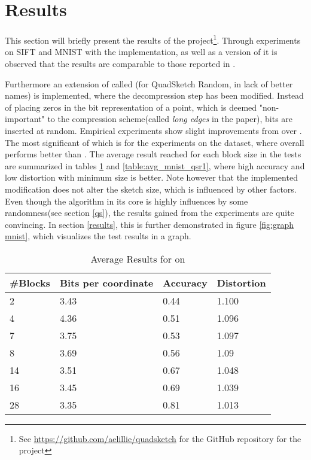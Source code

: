 \section{Results}
\label{contribution}
This section will briefly present the results of the project\footnote{See \url{https://github.com/aelillie/quadsketch} for the GitHub repository for the project}. Through experiments on SIFT and MNIST with the \qs{} implementation, as well as a version of \gr{} it is observed that the results are comparable to those reported in \cite{wagner17}. 

Furthermore an extension of \qs{} called \qsr{} (for QuadSketch Random, in lack of better names) is implemented, where the decompression step has been modified. Instead of placing zeros in the bit representation of a point, which is deemed "non-important" to the compression scheme(called \textit{long edges} in the paper), bits are inserted at random. Empirical experiments show slight improvements from \qsr{} over \qs{}. The most significant of which is for the experiments on the \mnist{} dataset, where \qsr{} overall performs better than \qs{}. The average result reached for each block size in the tests are summarized in tables \ref{table:avg_mnist_qs1} and \ref{table:avg_mnist_qsr1}, where high accuracy and low distortion with minimum size is better. Note however that the implemented modification does not alter the sketch size, which is influenced by other factors. Even though the algorithm in its core is highly influences by some randomness(see section \ref{qs}), the results gained from the experiments are quite convincing. In section \ref{results}, this is further demonstrated in figure \ref{fig:graph mnist}, which visualizes the test results in a graph.


\begin{table}[h]
	\centering
	\caption{Average Results for \qs{} on \mnist{}}
	\label{table:avg_mnist_qs1}
	\begin{tabular}{l l l l}
		\hline
		\#Blocks & Bits per coordinate & Accuracy  & Distortion \\ \hline
		2 & 3.43 & 0.44 & 1.100  \\
		4 & 4.36 & 0.51 & 1.096  \\
		7 & 3.75 & 0.53 & 1.097 \\
		8 & 3.69 & 0.56 & 1.09 \\
		14 & 3.51 & 0.67 & 1.048 \\
		16 & 3.45 & 0.69 & 1.039 \\
		28 & 3.35 & 0.81 & 1.013 \\
		\hline
	\end{tabular}
\end{table}

